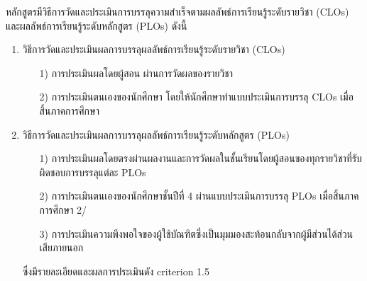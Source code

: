 \begin{doclist}
\end{doclist}



หลักสูตรมีวิธีการวัดและประเมินการบรรลุความสำเร็จตามผลลัพธ์การเรียนรู้ระดับรายวิชา (CLOs) และผลลัพธ์การเรียนรู้ระดับหลักสูตร (PLOs) ดังนี้
\begin{enumerate}
	\item วิธีการวัดและประเมินผลการบรรลุผลลัพธ์การเรียนรู้ระดับรายวิชา (CLOs)
	\begin{itemize}
		\item[1)] การประเมินผลโดยผู้สอน ผ่านการวัดผลของรายวิชา
		\item[2)] การประเมินตนเองของนักศึกษา โดยให้นักศึกษาทำแบบประเมินการบรรลุ CLOs เมื่อสิ้นภาคการศึกษา
	\end{itemize}
	\item วิธีการวัดและประเมินผลการบรรลุผลลัพธ์การเรียนรู้ระดับหลักสูตร (PLOs)
	\begin{itemize}
		\item[1)] การประเมินผลโดยตรงผ่านผลงานและการวัดผลในชั้นเรียนโดยผู้สอนของทุกรายวิชาที่รับผิดชอบการบรรลุแต่ละ PLOs 
		\item[2)] การประเมินตนเองของนักศึกษาชั้นปีที่ 4 ผ่านแบบประเมินการบรรลุ PLOs เมื่อสิ้นภาคการศึกษา 2/\printyear{} 
		\item[3)] การประเมินความพึงพอใจของผู้ใช้บัณฑิตซึ่งเป็นมุมมองสะท้อนกลับจากผู้มีส่วนได้ส่วนเสียภายนอก
	\end{itemize}
	ซึ่งมีรายละเอียดและผลการประเมินดัง criterion 1.5
\end{enumerate}
\begin{doclist}
\end{doclist}


